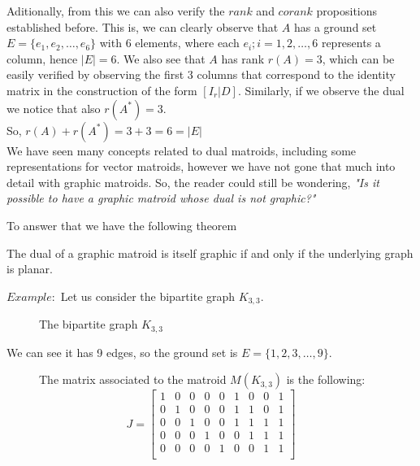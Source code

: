 Aditionally, from this we can also verify the $rank$ and $corank$ propositions established before. This is, we can clearly observe that $A$ has a ground set $E=\{e_1, e_2, \dots , e_6\}$ with 6 elements, where each $e_i; i =1,2, \dots,6$ represents a column, hence $|E|=6$. We also see that $A$ has rank $r(A)=3$, which can be easily verified by observing the first 3 columns that correspond to the identity matrix in the construction of the form $[I_r|D]$. Similarly, if we observe the dual we notice that also $r(A^*)=3$. \\So, $r(A)+r(A^*)= 3 + 3 = 6 = |E|$\\


%

We have seen many concepts related to dual matroids, including some representations for vector matroids, however we have not gone that much into detail with graphic matroids. So, the reader could still be wondering, \textit{"Is it possible to have a graphic matroid whose dual is not graphic?"}

To answer that we have the following theorem

\begin{theorem}
    \item  The dual of a graphic matroid is itself graphic if and only if the underlying graph is planar.
\end{theorem}

$Example:$ Let us consider the bipartite graph $K_{3,3}$.
\begin{figure}[H]
\centering
{}
    \caption{The bipartite graph $K_{3,3}$}
    \label{fig:enter-label}
\end{figure}

We can see it has 9 edges, so the ground set is $E=\{1,2,3, \dots, 9\} $.

\begin{figure}[H]
The matrix associated to the matroid $M(K_{3,3})$ is the following:
$$J = \begin{bmatrix}
    1 & 0 & 0 & 0 & 0 & 1 & 0 & 0 & 1\\
    0 & 1 & 0 & 0 & 0 & 1 & 1 & 0 & 1\\
    0 & 0 & 1 & 0 & 0 & 1 & 1 & 1 & 1\\
    0 & 0 & 0 & 1 & 0 & 0 & 1 & 1 & 1\\
    0 & 0 & 0 & 0 & 1 & 0 & 0 & 1 & 1\\
\end{bmatrix}$$
\end{figure}


